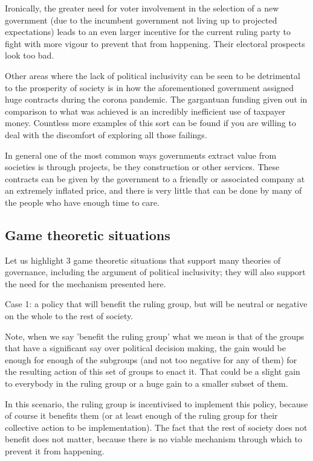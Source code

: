 \documentclass[twoside]{article}
\theoremstyle{definition}
\begin{document}
Ironically, the greater need for voter involvement in the selection of a new government (due to the incumbent government not living up to projected expectations) leads to an even larger incentive for the current ruling party to fight with more vigour to prevent that from happening. Their electoral prospects look too bad.

Other areas where the lack of political inclusivity can be seen to be detrimental to the prosperity of society is in how the aforementioned government assigned huge contracts during the corona pandemic. The gargantuan funding given out in comparison to what was achieved is an incredibly inefficient use of taxpayer money. Countless more examples of this sort can be found if you are willing to deal with the discomfort of exploring all those failings.

In general one of the most common ways governments extract value from societies is through projects, be they construction or other services. These contracts can be given by the government to a friendly or associated company at an extremely inflated price, and there is very little that can be done by many of the people who have enough time to care.

\subsection{Game theoretic situations}

Let us highlight 3 game theoretic situations that support many theories of governance, including the argument of political inclusivity; they will also support the need for the mechanism presented here.

Case 1: a policy that will benefit the ruling group, but will be neutral or negative on the whole to the rest of society.

Note, when we say 'benefit the ruling group' what we mean is that of the groups that have a significant say over political decision making, the gain would be enough for enough of the subgroups (and not too negative for any of them) for the resulting action of this set of groups to enact it. That could be a slight gain to everybody in the ruling group or a huge gain to a smaller subset of them.

In this scenario, the ruling group is incentivised to implement this policy, because of course it benefits them (or at least enough of the ruling group for their collective action to be implementation). The fact that the rest of society does not benefit does not matter, because there is no viable mechanism through which to prevent it from happening.
\end{document}
